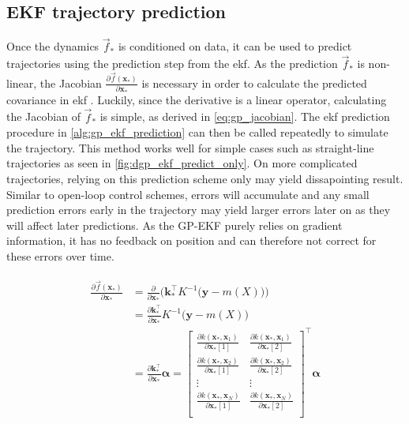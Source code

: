 \subsection{EKF trajectory prediction}
Once the dynamics $\vec{f}_*$ is conditioned on data, it can be used to predict trajectories using the prediction step from the \acrshort{ekf}. As the prediction $\vec{f}_*$ is non-linear, the Jacobian $\frac{\partial \vec{f}(\boldsymbol{x}_*)}{\partial \boldsymbol{x}_*}$ is necessary in order to calculate the predicted covariance in \acrshort{ekf} \cite{gpekf}. Luckily, since the derivative is a linear operator, calculating the Jacobian of $\vec{f}_*$ is simple, as derived in \cref{eq:gp_jacobian}. The \acrshort{ekf} prediction procedure in \cref{alg:gp_ekf_prediction} can then be called repeatedly to simulate the trajectory. This method works well for simple cases such as straight-line trajectories as seen in \cref{fig:dgp_ekf_predict_only}. On more complicated trajectories, relying on this prediction scheme only may yield dissapointing result. Similar to open-loop control schemes, errors will accumulate and any small prediction errors early in the trajectory may yield larger errors later on as they will affect later predictions. As the GP-EKF purely relies on gradient information, it has no feedback on position and can therefore not correct for these errors over time.




\begin{align}\label{eq:gp_jacobian}
    \begin{split}
        \frac{\partial \vec{f}(\boldsymbol{x}_*)}{\partial \boldsymbol{x}_*} &= \frac{\partial}{\partial \boldsymbol{x}_*} \bigg(\boldsymbol{k}_*^\intercal K^{-1} \big(\boldsymbol{y} - m(X)\big)\bigg)\\
        &= \frac{\partial \boldsymbol{k}_*^\intercal}{\partial \boldsymbol{x}_*} K^{-1} \big(\boldsymbol{y} - m(X)\big)\\
        &= \frac{\partial \boldsymbol{k}_*^\intercal}{\partial \boldsymbol{x}_*} \boldsymbol{\alpha} = \begin{bmatrix}
            \frac{\partial k(\boldsymbol{x}_*, \boldsymbol{x}_1)}{\partial \boldsymbol{x}_*[1]} & \frac{\partial k(\boldsymbol{x}_*, \boldsymbol{x}_1)}{\partial \boldsymbol{x}_*[2]} \\
            \frac{\partial k(\boldsymbol{x}_*, \boldsymbol{x}_2)}{\partial \boldsymbol{x}_*[1]} & \frac{\partial k(\boldsymbol{x}_*, \boldsymbol{x}_2)}{\partial \boldsymbol{x}_*[2]} \\
            \vdots & \vdots \\
            \frac{\partial k(\boldsymbol{x}_*, \boldsymbol{x}_N)}{\partial \boldsymbol{x}_*[1]} & \frac{\partial k(\boldsymbol{x}_*, \boldsymbol{x}_N)}{\partial \boldsymbol{x}_*[2]} \\
        \end{bmatrix}^\intercal \boldsymbol{\alpha}
    \end{split}
\end{align}

